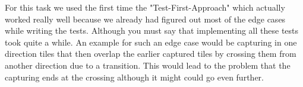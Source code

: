 \noindent For this task we used the first time the "Test-First-Approach" which actually worked really well because we already had figured out most of the edge cases while writing the tests. Although you must say that implementing all these tests took quite a while. An example for such an edge case would be capturing in one direction tiles that then overlap the earlier captured tiles by crossing them from another direction due to a transition. This would lead to the problem that the capturing ends at the crossing although it might could go even further.\\
